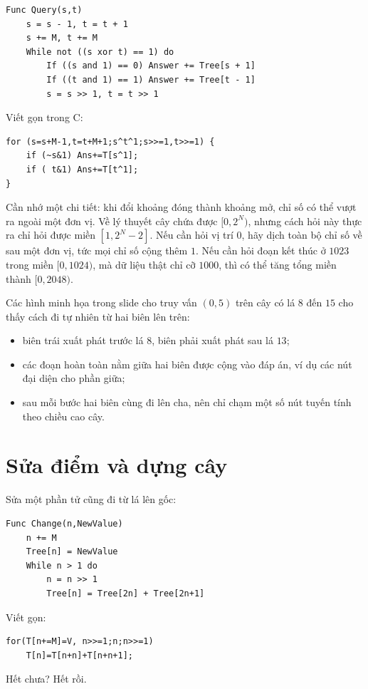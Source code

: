 \documentclass[11pt]{article}
\begin{document}
\begin{verbatim}
Func Query(s,t)
    s = s - 1, t = t + 1
    s += M, t += M
    While not ((s xor t) == 1) do
        If ((s and 1) == 0) Answer += Tree[s + 1]
        If ((t and 1) == 1) Answer += Tree[t - 1]
        s = s >> 1, t = t >> 1
\end{verbatim}

Viết gọn trong C:
\begin{verbatim}
for (s=s+M-1,t=t+M+1;s^t^1;s>>=1,t>>=1) {
    if (~s&1) Ans+=T[s^1];
    if ( t&1) Ans+=T[t^1];
}
\end{verbatim}

Cần nhớ một chi tiết: khi đổi khoảng đóng thành khoảng mở, chỉ số có thể vượt
ra ngoài một đơn vị.  Về lý thuyết cây chứa được $[0,2^N)$, nhưng cách hỏi này
thực ra chỉ hỏi được miền $[1,2^N-2]$.  Nếu cần hỏi vị trí $0$, hãy dịch toàn
bộ chỉ số về sau một đơn vị, tức mọi chỉ số cộng thêm $1$.  Nếu cần hỏi đoạn
kết thúc ở $1023$ trong miền $[0,1024)$, mà dữ liệu thật chỉ cỡ $1000$, thì
có thể tăng tổng miền thành $[0,2048)$.

Các hình minh họa trong slide cho truy vấn $(0,5)$ trên cây có lá $8$ đến
$15$ cho thấy cách đi tự nhiên từ hai biên lên trên:
\begin{itemize}
  \item biên trái xuất phát trước lá $8$, biên phải xuất phát sau lá $13$;
  \item các đoạn hoàn toàn nằm giữa hai biên được cộng vào đáp án, ví dụ các
  nút đại diện cho phần giữa;
  \item sau mỗi bước hai biên cùng đi lên cha, nên chỉ chạm một số nút tuyến
  tính theo chiều cao cây.
\end{itemize}

\section{Sửa điểm và dựng cây}

Sửa một phần tử cũng đi từ lá lên gốc:
\begin{verbatim}
Func Change(n,NewValue)
    n += M
    Tree[n] = NewValue
    While n > 1 do
        n = n >> 1
        Tree[n] = Tree[2n] + Tree[2n+1]
\end{verbatim}

Viết gọn:
\begin{verbatim}
for(T[n+=M]=V, n>>=1;n;n>>=1)
    T[n]=T[n+n]+T[n+n+1];
\end{verbatim}

Hết chưa?  Hết rồi.
\end{document}
